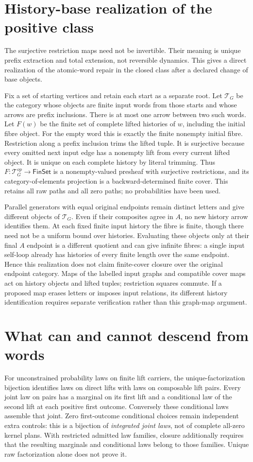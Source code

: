 \documentclass[11pt]{article}
\begin{document}
\section{History-base realization of the positive class}
The surjective restriction maps need not be invertible. Their meaning is unique prefix extraction and total extension, not reversible dynamics. This gives a direct realization of the atomic-word repair in the closed class after a declared change of base objects.

Fix a set of starting vertices and retain each start as a separate root. Let $\mathcal T_G$ be the category whose objects are finite input words from those starts and whose arrows are prefix inclusions. There is at most one arrow between two such words. Let $F(w)$ be the finite set of complete lifted histories of $w$, including the initial fibre object. For the empty word this is exactly the finite nonempty initial fibre. Restriction along a prefix inclusion trims the lifted tuple. It is surjective because every omitted next input edge has a nonempty lift from every current lifted object. It is unique on each complete history by literal trimming. Thus $F:\mathcal T_G^{op}\to\mathsf{FinSet}$ is a nonempty-valued presheaf with surjective restrictions, and its category-of-elements projection is a backward-determined finite cover. This retains all raw paths and all zero paths; no probabilities have been used.

Parallel generators with equal original endpoints remain distinct letters and give different objects of $\mathcal T_G$. Even if their composites agree in $A$, no new history arrow identifies them. At each fixed finite input history the fibre is finite, though there need not be a uniform bound over histories. Evaluating these objects only at their final $A$ endpoint is a different quotient and can give infinite fibres: a single input self-loop already has histories of every finite length over the same endpoint. Hence this realization does not claim finite-cover closure over the original endpoint category. Maps of the labelled input graphs and compatible cover maps act on history objects and lifted tuples; restriction squares commute. If a proposed map erases letters or imposes input relations, its different history identification requires separate verification rather than this graph-map argument.

\section{What can and cannot descend from words}
For unconstrained probability laws on finite lift carriers, the unique-factorization bijection identifies laws on direct lifts with laws on composable lift pairs. Every joint law on pairs has a marginal on its first lift and a conditional law of the second lift at each positive first outcome. Conversely these conditional laws assemble that joint. Zero first-outcome conditional choices remain independent extra controls: this is a bijection of \emph{integrated joint laws}, not of complete all-zero kernel plans. With restricted admitted law families, closure additionally requires that the resulting marginals and conditional laws belong to those families. Unique raw factorization alone does not prove it.
\end{document}
